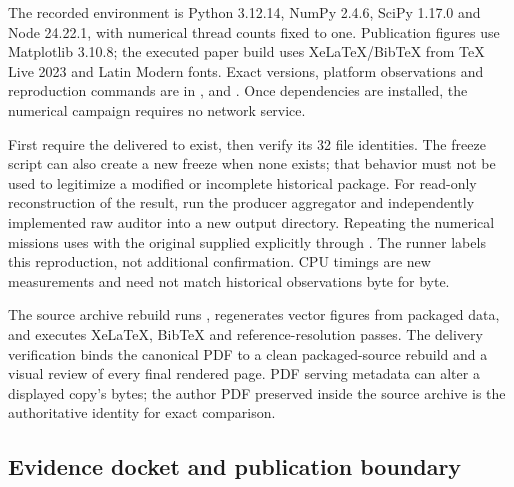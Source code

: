 The recorded environment is Python 3.12.14, NumPy 2.4.6, SciPy 1.17.0 and Node 24.22.1, with numerical
thread counts fixed to one. Publication figures use Matplotlib 3.10.8; the executed paper build uses
XeLaTeX/BibTeX from TeX Live 2023 and Latin Modern fonts. Exact versions, platform observations and
reproduction commands are in ,  and
. Once dependencies are installed, the numerical campaign requires no network service.

First require the delivered  to exist, then verify its 32 file identities.
The freeze script can also create a new freeze when none exists; that behavior must not be used to legitimize
a modified or incomplete historical package. For read-only reconstruction of the result, run the producer
aggregator and independently implemented raw auditor into a new output directory. Repeating the numerical
missions uses  with the original  supplied explicitly
through . The runner labels this reproduction, not additional confirmation. CPU
timings are new measurements and need not match historical observations byte for byte.

The source archive rebuild runs , regenerates vector figures from packaged data,
and executes XeLaTeX, BibTeX and reference-resolution passes. The delivery verification binds the canonical
PDF to a clean packaged-source rebuild and a visual review of every final rendered page. PDF serving
metadata can alter a displayed copy's bytes; the author PDF preserved inside the source archive is the
authoritative identity for exact comparison.

\subsection{Evidence docket and publication boundary}

